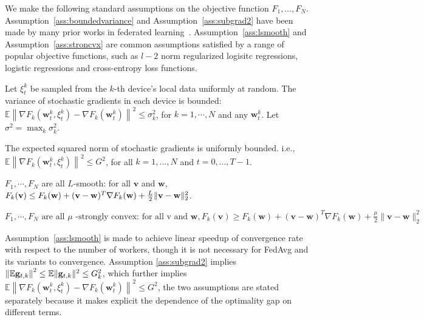 We make the following standard assumptions on the objective function $F_1,\dots, F_N$. Assumption~\ref{ass:boundedvariance} and Assumption~\ref{ass:subgrad2} have been made by many prior works in federated learning~\cite{yu2019parallel,li2019convergence,stich2018local}. Assumption~\ref{ass:lsmooth} and Assumption~\ref{ass:stroncvx} are common assumptions satisfied by a range of popular objective functions, such as $l-2$
norm regularized logisitc regressions, logistic regressions and cross-entropy loss functions.  

\begin{assumption}
	Let $\xi_{t}^{k}$ be sampled from the $k$-th device's local data uniformly at random. The variance of stochastic gradients in each device is bounded: $\mathbb{E}\left\|\nabla F_{k}\left(\mathbf{w}_{t}^{k}, \xi_{t}^{k}\right)-\nabla F_{k}\left(\mathbf{w}_{t}^{k}\right)\right\|^{2} \leq \sigma_{k}^{2}$,
	for $k=1, \cdots, N$ and any $\mathbf{w}_{t}^{k}$. Let $\sigma^2=\max_k\sigma_{k}^{2}$.
	\label{ass:boundedvariance}
\end{assumption}
\begin{assumption}
	The expected squared norm of stochastic gradients is uniformly bounded. i.e.,
	$\mathbb{E}\left\|\nabla F_{k}\left(\mathbf{w}_{t}^{k}, \xi_{t}^{k}\right)\right\|^{2} \leq G^{2}$, for all $k = 1,..., N$ and $t=0, \dots, T-1$.
	\label{ass:subgrad2}
\end{assumption}
\begin{assumption}[L-smooth]
	$F_{1}, \cdots, F_{N}$ are all $L$-smooth: for all  $\mathbf{v}$  and $\mathbf{w}$, $F_{k}(\mathbf{v}) \leq F_{k}(\mathbf{w})+(\mathbf{v}- \\ \mathbf{w})^{T} \nabla F_{k}(\mathbf{w})+\frac{L}{2}\|\mathbf{v}-\mathbf{w}\|_{2}^{2}$.
	\label{ass:lsmooth}
\end{assumption}
\begin{assumption}
	$	F_{1}, \cdots, F_{N} \text { are all } \mu \text { -strongly convex: for all v and } \mathbf{w}, F_{k}(\mathbf{v}) \geq F_{k}(\mathbf{w})+(\mathbf{v}-\mathbf{w})^{T} \nabla F_{k}(\mathbf{w})+\frac{\mu}{2}\|\mathbf{v}-\mathbf{w}\|_{2}^{2}$
	\label{ass:stroncvx}
\end{assumption}
Assumption~\ref{ass:lsmooth} is made to achieve linear speedup 
of convergence rate with respect to the number of workers, though it
is not necessary for FedAvg and its variants to convergence.
Assumption \ref{ass:subgrad2} implies $\left\| \mathbb{E}{\mathbf{g}}_{t,k}\right\|^2  \leq \mathbb{E}\|{\mathbf{g}}_{t,k}\|^2 \leq G_k^2$, which further implies $\mathbb{E}\left\|\nabla F_{k}\left(\mathbf{w}_{t}^{k}, \xi_{t}^{k}\right)-\nabla F_{k}\left(\mathbf{w}_{t}^{k}\right)\right\|^{2} \leq G^2$, the two assumptions are stated separately because it makes explicit the dependence of the optimality gap on different terms. 


